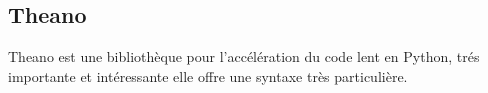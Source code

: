 \subsection{Theano}
Theano est une bibliothèque pour l'accélération du code lent en Python, tr\'es importante et intéressante
elle offre une syntaxe très particulière.